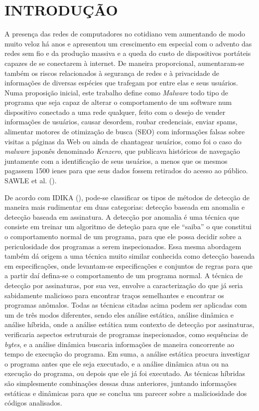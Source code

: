 \chapter{INTRODUÇÃO}
\label{c.introducao}

A presença das redes de computadores no cotidiano vem aumentando de modo muito
veloz há anos e apresentou um crescimento em especial com o advento das redes
sem fio e da produção massiva e a queda do custo de dispositivos portáteis
capazes de se conectarem à internet. De maneira proporcional, aumentaram-se
também os riscos relacionados à segurança de redes e à privacidade de
informações de diversas espécies que trafegam por entre elas e seus usuários.
Numa proposição inicial, este trabalho define como \textit{Malware} todo tipo de
programa que seja capaz de alterar o comportamento de um software num
dispositivo conectado a uma rede qualquer, feito com o desejo de vender
informações de usuários, causar desordem, roubar credenciais, enviar spams,
alimentar motores de otimização de busca (SEO) com informações falsas sobre
visitas a páginas da Web ou ainda de chantagear usuários, como foi o caso do
\textit{malware} japonês denominado \textit{Kenzero}, que publicava históricos de navegação
juntamente com a identificação de seus usuários, a menos que os mesmos
pagassem 1500 ienes para que seus dados fossem retirados do acesso ao público.
SAWLE et al. (\citeyear{sawle14}).

De acordo com IDIKA (\citeyear{idika07}), pode-se classificar os tipos de
métodos de detecção de maneira mais rudimentar em duas categorias: detecção
baseada em anomalia e detecção baseada em assinatura. A detecção por anomalia
é uma técnica que consiste em treinar um algoritmo de deteção para que ele
“saiba” o que constitui o comportamento normal de um programa, para que ele
possa decidir sobre a periculosidade dos programas a serem inspecionados. Essa
mesma abordagem também dá origem a uma técnica muito similar conhecida como
detecção baseada em especificações, onde levantam-se especificações e
conjuntos de regras para que a partir daí defina-se o comportamento de um
programa normal. A técnica de detecção por assinaturas, por sua vez, envolve a
caracterização do que já seria sabidamente malicioso para encontrar traços
semelhantes e encontrar os programas anômalos. Todas as técnicas citadas acima
podem ser aplicadas com um de três modos diferentes, sendo eles análise
estática, análise dinâmica e análise híbrida, onde a análise estática num
contexto de detecção por assinaturas, verificaria aspectos estruturais de
programas inspecionados, como sequências de \textit{bytes}, e a análise dinâmica
buscaria informações de maneira concorrente ao tempo de execução do programa.
Em suma, a análise estática procura investigar o programa antes que ele seja
executado, e a análise dinâmica atua ou na execução do programa, ou depois que
ele já foi executado. As técnicas híbridas são simplesmente combinações dessas
duas anteriores, juntando informações estáticas e dinâmicas para que se
conclua um parecer sobre a maliciosidade dos códigos analisados.

